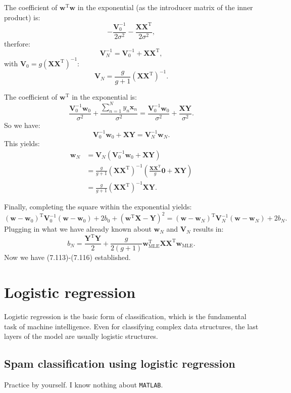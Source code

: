 \documentclass[UTF8]{ctexart}
\begin{document}
The coefficient of $\textbf{w}^{\text{T}}\textbf{w}$ in the exponential (as the introducer matrix of the inner product) is:
$$-\frac{\textbf{V}_{0}^{-1}}{2\sigma^{2}}-\frac{\textbf{X}\textbf{X}^{\text{T}}}{2\sigma^{2}},$$
therfore:
$$\textbf{V}_{N}^{-1}=\textbf{V}_{0}^{-1}+\textbf{X}\textbf{X}^{\text{T}},$$
with $\textbf{V}_{0}=g(\textbf{X}\textbf{X}^{\text{T}})^{-1}$:
$$\textbf{V}_{N}=\frac{g}{g+1}\left(\textbf{X}\textbf{X}^{\text{T}} \right)^{-1}.$$

The coefficient of $\textbf{w}^{\text{T}}$ in the exponential is:
$$\frac{\textbf{V}_{0}^{-1}\textbf{w}_{0}}{\sigma^{2}}+\frac{\sum_{n=1}^{N}y_{n}\textbf{x}_{n}}{\sigma^{2}}=\frac{\textbf{V}_{0}^{-1}\textbf{w}_{0}}{\sigma^{2}}+\frac{\textbf{X}\textbf{Y}}{\sigma^{2}}.$$
So we have:
$$\textbf{V}_{0}^{-1}\textbf{w}_{0}+\textbf{X}\textbf{Y}=\textbf{V}_{N}^{-1}\textbf{w}_{N}.$$
This yields:
$$
\begin{aligned}
\textbf{w}_{N}&=\textbf{V}_{N}\left(\textbf{V}_{0}^{-1}\textbf{w}_{0}+\textbf{X}\textbf{Y} \right)\\
&=\frac{g}{g+1}\left(\textbf{X}\textbf{X}^{\text{T}} \right)^{-1}\left(\frac{\textbf{X}\textbf{X}^{\text{T}}}{g}\textbf{0}+\textbf{X}\textbf{Y} \right)\\
&=\frac{g}{g+1}\left(\textbf{X}\textbf{X}^{\text{T}} \right)^{-1}\textbf{X}\textbf{Y}.
\end{aligned}
$$

Finally, completing the square within the exponential yields:
$$(\textbf{w}-\textbf{w}_{0})^{\text{T}}\textbf{V}_{0}^{-1}(\textbf{w}-\textbf{w}_{0})+2b_{0}+(\textbf{w}^{\text{T}}\textbf{X}-\textbf{Y})^{2}=(\textbf{w}-\textbf{w}_{N})^{\text{T}}\textbf{V}_{N}^{-1}(\textbf{w}-\textbf{w}_{N})+2b_{N}.$$
Plugging in what we have already known about $\textbf{w}_{N}$ and $\textbf{V}_{N}$ results in:
$$b_{N}=\frac{\textbf{Y}^{\text{T}}\textbf{Y}}{2}+\frac{g}{2(g+1)}\textbf{w}_{\text{MLE}}^{\text{T}}\textbf{X}\textbf{X}^{\text{T}}\textbf{w}_{\text{MLE}}.$$
Now we have (7.113)-(7.116) established.


\newpage
\section{Logistic regression}
Logistic regression is the basic form of classification, which is the fundamental task of machine intelligence.
Even for classifying complex data structures, the last layers of the model are usually logistic structures.

\subsection{Spam classification using logistic regression}
Practice by yourself.
I know nothing about \texttt{MATLAB}.
\end{document}
